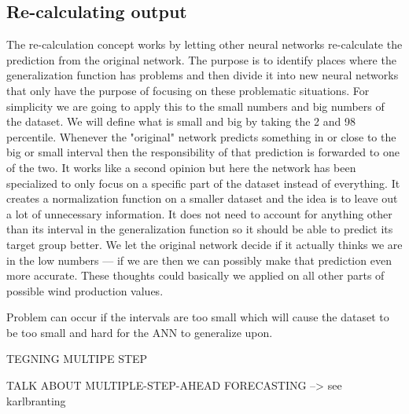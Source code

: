 \subsection{Re-calculating output}
The re-calculation concept works by letting other neural networks re-calculate the prediction from the original network. The purpose is to identify places where the generalization function has problems and then divide it into new neural networks that only have the purpose of focusing on these problematic situations. For simplicity we are going to apply this to the small numbers and big numbers of the dataset. We will define what is small and big by taking the 2 and 98 percentile. Whenever the "original" network predicts something in or close to the big or small interval then the responsibility of that prediction is forwarded to one of the two. It works like a second opinion but here the network has been specialized to only focus on a specific part of the dataset instead of everything. It creates a normalization function on a smaller dataset and the idea is to leave out a lot of unnecessary information. It does not need to account for anything other than its interval in the generalization function so it should be able to predict its target group better. We let the original network decide if it actually thinks we are in the low numbers --- if we are then we can possibly make that prediction even more accurate. These thoughts could basically we applied on all other parts of possible wind production values. 

Problem can occur if the intervals are too small which will cause the dataset to be too small and hard for the ANN to generalize upon.



TEGNING MULTIPE STEP

TALK ABOUT MULTIPLE-STEP-AHEAD FORECASTING --> see karlbranting
